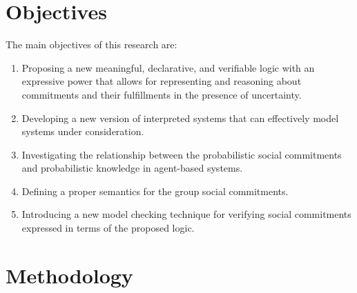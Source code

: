 \section{Objectives} \label{sec:objectives-chap1}
The main objectives of this research are:

\begin{enumerate}

\item Proposing a new meaningful, declarative, and verifiable logic with an expressive power that allows for representing and reasoning about commitments and their fulfillments in the presence of uncertainty.

\item Developing a new version of interpreted systems that can effectively model systems under consideration.

\item Investigating the relationship between the probabilistic social commitments and probabilistic knowledge in agent-based systems.

\item Defining a proper semantics for the group social commitments.

\item Introducing a new model checking technique for verifying social commitments expressed in terms of the proposed logic. %


\end{enumerate}



\section{Methodology} \label{sec:methodology-chap1}

